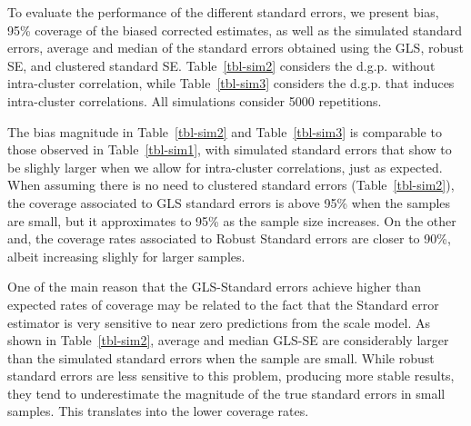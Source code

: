 \documentclass[
  authoryear,
  review,
  1p]{elsarticle}
\begin{document}
To evaluate the performance of the different standard errors, we present
bias, 95\% coverage of the biased corrected estimates, as well as the
simulated standard errors, average and median of the standard errors
obtained using the GLS, robust SE, and clustered standard SE.
Table~\ref{tbl-sim2} considers the d.g.p. without intra-cluster
correlation, while Table~\ref{tbl-sim3} considers the d.g.p. that
induces intra-cluster correlations. All simulations consider 5000
repetitions.

The bias magnitude in Table~\ref{tbl-sim2} and Table~\ref{tbl-sim3} is
comparable to those observed in Table~\ref{tbl-sim1}, with simulated
standard errors that show to be slighly larger when we allow for
intra-cluster correlations, just as expected. When assuming there is no
need to clustered standard errors (Table~\ref{tbl-sim2}), the coverage
associated to GLS standard errors is above 95\% when the samples are
small, but it approximates to 95\% as the sample size increases. On the
other and, the coverage rates associated to Robust Standard errors are
closer to 90\%, albeit increasing slighly for larger samples.

One of the main reason that the GLS-Standard errors achieve higher than
expected rates of coverage may be related to the fact that the Standard
error estimator is very sensitive to near zero predictions from the
scale model. As shown in Table~\ref{tbl-sim2}, average and median GLS-SE
are considerably larger than the simulated standard errors when the
sample are small. While robust standard errors are less sensitive to
this problem, producing more stable results, they tend to underestimate
the magnitude of the true standard errors in small samples. This
translates into the lower coverage rates.
\end{document}
